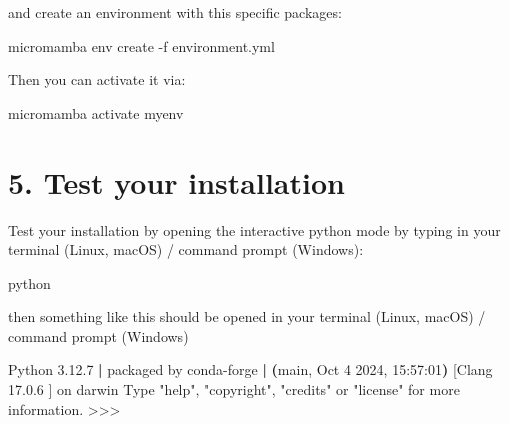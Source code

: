 \documentclass[
  letterpaper,
  DIV=11,
  numbers=noendperiod]{scrreprt}
\newenvironment{Shaded}{\begin{snugshade}}{\end{snugshade}}
\newcommand{\AttributeTok}[1]{\textcolor[rgb]{0.40,0.45,0.13}{#1}}
\newcommand{\ExtensionTok}[1]{\textcolor[rgb]{0.00,0.23,0.31}{#1}}
\newcommand{\KeywordTok}[1]{\textcolor[rgb]{0.00,0.23,0.31}{\textbf{#1}}}
\newcommand{\NormalTok}[1]{\textcolor[rgb]{0.00,0.23,0.31}{#1}}
\newcommand{\OperatorTok}[1]{\textcolor[rgb]{0.37,0.37,0.37}{#1}}
\newcommand{\StringTok}[1]{\textcolor[rgb]{0.13,0.47,0.30}{#1}}
\begin{document}
and create an environment with this specific packages:

\begin{Shaded}
\begin{Highlighting}[]
\ExtensionTok{micromamba}\NormalTok{ env create }\AttributeTok{{-}f}\NormalTok{ environment.yml}
\end{Highlighting}
\end{Shaded}

Then you can activate it via:

\begin{Shaded}
\begin{Highlighting}[]
\ExtensionTok{micromamba}\NormalTok{ activate myenv}
\end{Highlighting}
\end{Shaded}

\section*{5. Test your installation}\label{test-your-installation}


Test your installation by opening the interactive python mode by typing
in your terminal (Linux, macOS) / command prompt (Windows):

\begin{Shaded}
\begin{Highlighting}[]
\ExtensionTok{python}
\end{Highlighting}
\end{Shaded}

then something like this should be opened in your terminal (Linux,
macOS) / command prompt (Windows)

\begin{Shaded}
\begin{Highlighting}[]
\ExtensionTok{Python}\NormalTok{ 3.12.7 }\KeywordTok{|} \ExtensionTok{packaged}\NormalTok{ by conda{-}forge }\KeywordTok{|} \KeywordTok{(}\ExtensionTok{main,}\NormalTok{ Oct  4 2024, 15:57:01}\KeywordTok{)} \ExtensionTok{[Clang}\NormalTok{ 17.0.6 ] on darwin}
\ExtensionTok{Type} \StringTok{"help"}\NormalTok{, }\StringTok{"copyright"}\NormalTok{, }\StringTok{"credits"}\NormalTok{ or }\StringTok{"license"}\NormalTok{ for more information.}
\OperatorTok{\textgreater{}\textgreater{}\textgreater{}} 
\end{Highlighting}
\end{Shaded}
\end{document}
